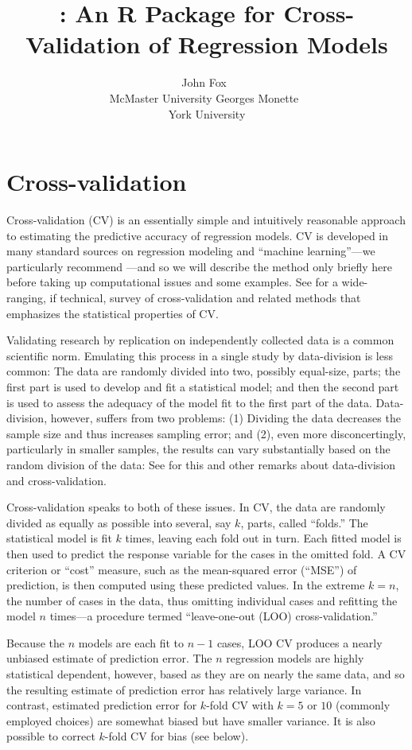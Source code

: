 \documentclass[
]{jss}
\author{
John Fox~\orcidlink{0000-0002-1196-8012}\\McMaster
University \And Georges Monette~\orcidlink{0000-0000-0000-0000}\\York
University
}
\title{\pkg{cv}: An R Package for Cross-Validation of Regression Models}
\begin{document}
\hypertarget{cross-validation}{%
\section{Cross-validation}\label{cross-validation}}

Cross-validation (CV) is an essentially simple and intuitively
reasonable approach to estimating the predictive accuracy of regression
models. CV is developed in many standard sources on regression modeling
and ``machine learning''---we particularly recommend \citet[Secs. 5.1,
5.3]{JamesEtAl:2021}---and so we will describe the method only briefly
here before taking up computational issues and some examples. See
\citet{ArlotCelisse:2010} for a wide-ranging, if technical, survey of
cross-validation and related methods that emphasizes the statistical
properties of CV.

Validating research by replication on independently collected data is a
common scientific norm. Emulating this process in a single study by
data-division is less common: The data are randomly divided into two,
possibly equal-size, parts; the first part is used to develop and fit a
statistical model; and then the second part is used to assess the
adequacy of the model fit to the first part of the data. Data-division,
however, suffers from two problems: (1) Dividing the data decreases the
sample size and thus increases sampling error; and (2), even more
disconcertingly, particularly in smaller samples, the results can vary
substantially based on the random division of the data: See \citet[Sec.
5.3]{Harrell:2015} for this and other remarks about data-division and
cross-validation.

Cross-validation speaks to both of these issues. In CV, the data are
randomly divided as equally as possible into several, say \(k\), parts,
called ``folds.'' The statistical model is fit \(k\) times, leaving each
fold out in turn. Each fitted model is then used to predict the response
variable for the cases in the omitted fold. A CV criterion or ``cost''
measure, such as the mean-squared error (``MSE'') of prediction, is then
computed using these predicted values. In the extreme \(k = n\), the
number of cases in the data, thus omitting individual cases and
refitting the model \(n\) times---a procedure termed ``leave-one-out
(LOO) cross-validation.''

Because the \(n\) models are each fit to \(n - 1\) cases, LOO CV
produces a nearly unbiased estimate of prediction error. The \(n\)
regression models are highly statistical dependent, however, based as
they are on nearly the same data, and so the resulting estimate of
prediction error has relatively large variance. In contrast, estimated
prediction error for \(k\)-fold CV with \(k = 5\) or \(10\) (commonly
employed choices) are somewhat biased but have smaller variance. It is
also possible to correct \(k\)-fold CV for bias (see below).
\end{document}
